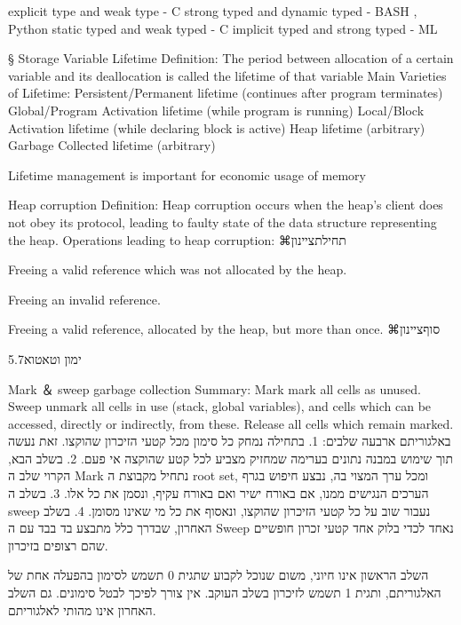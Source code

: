         explicit type and weak type - C
        strong typed and dynamic typed - BASH , Python
        static typed and weak typed - C
        implicit typed and strong typed - ML

§        Storage
        Variable Lifetime
        Definition:
        The period between allocation of a certain variable and its deallocation is called the lifetime of that variable
        Main Varieties of Lifetime:
        Persistent/Permanent lifetime (continues after program terminates)
        Global/Program Activation lifetime (while program is running)
        Local/Block Activation lifetime (while declaring block is active)
        Heap lifetime (arbitrary)
        Garbage Collected lifetime (arbitrary)

        Lifetime management is important for economic usage of memory

        Heap corruption
        Definition:
        Heap corruption occurs when the heap’s client does not obey its protocol, leading to faulty state of the data structure representing the heap.
        Operations leading to heap corruption:
        ⌘תחילת{ציינון}
          \item Freeing a valid reference which was not allocated by the heap.
          \item Freeing an invalid reference.
          \item Freeing a valid reference, allocated by the heap,
          but more than once.
        ⌘סוף{ציינון}

        5.7ימון וטאטוא

        Mark ＆ sweep garbage collection
        Summary:
        Mark mark all cells as unused.
        Sweep unmark all cells in use (stack, global variables), and cells which can be accessed, directly or indirectly, from these.
        Release all cells which remain marked.
        באלגוריתם ארבעה שלבים:
        1. בתחילה נמחק כל סימון מכל קטעי הזיכרון שהוקצו. זאת נעשה תוך שימוש במבנה נתונים בערימה שמחזיק מצביע לכל קטע שהוקצה אי פעם.
        2. בשלב הבא, הקרוי שלב ה Mark נתחיל מקבוצת ה root set, ומכל ערך המצוי בה, נבצע חיפוש בגרף הערכים הנגישים ממנו, אם באורח ישיר ואם באורח עקיף, ונסמן את כל אלו.
        3. בשלב ה sweep נעבור שוב על כל קטעי הזיכרון שהוקצו, ונאסוף את כל מי שאינו מסומן.
        4. בשלב האחרון, שבדרך כלל מתבצע בד בבד עם ה Sweep נאחד לכדי בלוק אחד קטעי זכרון חופשיים שהם רצופים בזיכרון.

        השלב הראשון אינו חיוני, משום שנוכל לקבוע שתגית 0 תשמש לסימון בהפעלה אחת של האלגוריתם, ותגית 1 תשמש לזיכרון בשלב העוקב. אין צורך לפיכך לבטל סימונים. גם השלב האחרון אינו מהותי לאלגוריתם.

